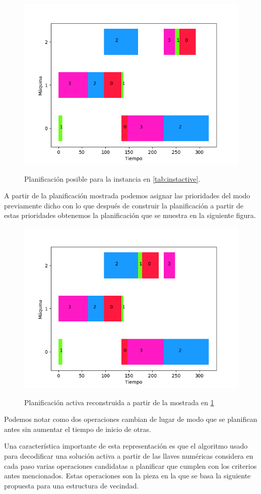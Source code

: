 \begin{figure}[H]
     \centering
     \includegraphics[scale=.7]{Imagenes/ganttnonactivepr.png}
     \label{fig:nonactivepr}
     \caption{Planificación posible para la instancia en \ref{tab:instactive}. }
\end{figure}
A partir de la planificación mostrada podemos asignar las prioridades del modo previamente dicho con lo que después de construir la planificación a partir de estas prioridades obtenemos la planificación que se muestra en la siguiente figura.
\begin{figure}[H]
     \centering
     \includegraphics[scale=.7]{Imagenes/ganttactivepr.png}
     \label{fig:activepr}
     \caption{Planificación activa reconstruida a partir de la mostrada en \ref{fig:nonactivepr}}
\end{figure}

Podemos notar como dos operaciones cambian de lugar de modo que se planifican antes sin aumentar el tiempo de inicio de otras.

Una característica importante de esta representación es que el algoritmo usado para decodificar una solución activa a partir de las llaves numéricas considera en cada paso varias operaciones candidatas a planificar que cumplen con los criterios antes mencionados. Estas operaciones son la pieza en la que se basa la siguiente propuesta para una estructura de vecindad.
